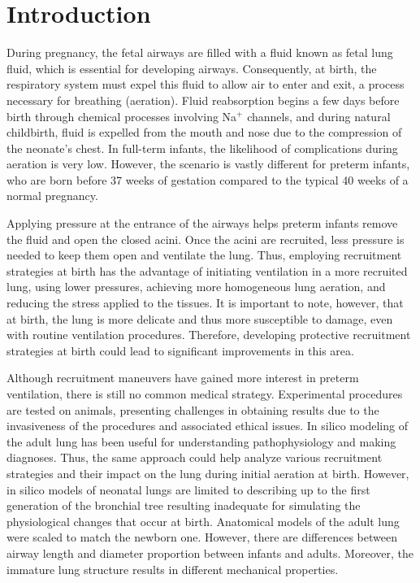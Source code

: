 \section{Introduction}
\label{sec:introduction}

During pregnancy, the fetal airways are filled with a fluid known as
fetal lung fluid, which is essential for developing
airways. Consequently, at birth, the respiratory system must expel
this fluid to allow air to enter and exit, a process necessary for
breathing (aeration). Fluid reabsorption begins a few days before
birth through chemical processes involving Na$^\text{+}$ channels, and
during natural childbirth, fluid is expelled from the mouth and nose
due to the compression of the neonate's chest. In full-term infants,
the likelihood of complications during aeration is very low. However,
the scenario is vastly different for preterm infants, who are born
before 37 weeks of gestation compared to the typical 40 weeks of a
normal pregnancy.

Applying pressure at the entrance of the airways helps preterm infants
remove the fluid and open the closed acini. Once the acini are
recruited, less pressure is needed to keep them open and ventilate the
lung. Thus, employing recruitment strategies at birth has the
advantage of initiating ventilation in a more recruited lung, using
lower pressures, achieving more homogeneous lung aeration, and
reducing the stress applied to the tissues. It is important to note,
however, that at birth, the lung is more delicate and thus more
susceptible to damage, even with routine ventilation
procedures. Therefore, developing protective recruitment strategies at
birth could lead to significant improvements in this area.

Although recruitment maneuvers have gained more interest in preterm
ventilation, there is still no common medical strategy. Experimental
procedures are tested on animals, presenting challenges in obtaining
results due to the invasiveness of the procedures and associated
ethical issues\cite{al-jumaily2011, herrmann2016}. In silico modeling
of the adult lung has been useful for understanding pathophysiology
and making diagnoses. Thus, the same approach could help analyze
various recruitment strategies and their impact on the lung during
initial aeration at birth. However, in silico models of neonatal lungs
are limited to describing up to the first generation of the bronchial
tree resulting inadequate for simulating the physiological changes
that occur at birth.  Anatomical models of the adult lung were scaled
to match the newborn one. However, there are differences between
airway length and diameter proportion between infants and
adults\cite{horsfield1987}. Moreover, the immature lung structure
results in different mechanical properties\cite{merkus1996}.


